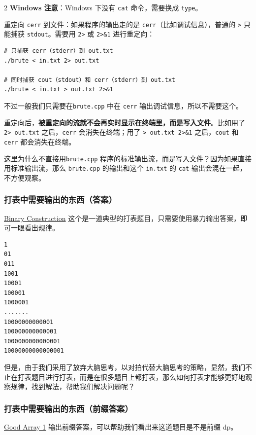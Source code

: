 \begin{multicols*}{2}
	\textbf{Windows 注意}：Windows 下没有 \texttt{cat} 命令，需要换成 \texttt{type}。

	重定向 \texttt{cerr} 到文件：如果程序的输出走的是 \texttt{cerr}（比如调试信息），普通的 \texttt{>} 只能捕获 \texttt{stdout}。需要用 \texttt{2>} 或 \texttt{2>\&1} 进行重定向：

	\begin{verbatim}
# 只捕获 cerr（stderr）到 out.txt
./brute < in.txt 2> out.txt

# 同时捕获 cout（stdout）和 cerr（stderr）到 out.txt
./brute < in.txt > out.txt 2>&1
	\end{verbatim}

	不过一般我们只需要在\texttt{brute.cpp} 中在 \texttt{cerr} 输出调试信息，所以不需要这个。

	重定向后，\textbf{被重定向的流就不会再实时显示在终端里，而是写入文件}。比如用了 \texttt{2> out.txt} 之后，\texttt{cerr} 会消失在终端；用了 \texttt{> out.txt 2>\&1} 之后，\texttt{cout} 和 \texttt{cerr} 都会消失在终端。

	这里为什么不直接用\texttt{brute.cpp} 程序的标准输出流，而是写入文件？因为如果直接用标准输出流，那么 \texttt{brute.cpp} 的输出和这个 \texttt{in.txt} 的 \texttt{cat} 输出会混在一起，不方便观察。

	\subsubsection{打表中需要输出的东西（答案）}
	\href{https://www.codechef.com/problems/BINCON}{Binary Construction} 这个是一道典型的打表题目，只需要使用暴力输出答案，即可一眼看出规律。

	\begin{verbatim}
1
01
011
1001
10001
100001
1000001
.......
10000000000001
100000000000001
1000000000000001
10000000000000001
	\end{verbatim}

	但是，由于我们采用了放弃大脑思考，以对拍代替大脑思考的策略，显然，我们不止在打表题目进行打表，而是在很多题目上都打表，那么如何打表才能够更好地观察规律，找到解法，帮助我们解决问题呢？

	\subsubsection{打表中需要输出的东西（前缀答案）}

	\href{https://www.codechef.com/problems/GOOD1}{Good Array 1} 输出前缀答案，可以帮助我们看出来这道题目是不是前缀 dp。

	\begin{verbatim}
	

\end{verbatim}
\end{multicols*}
